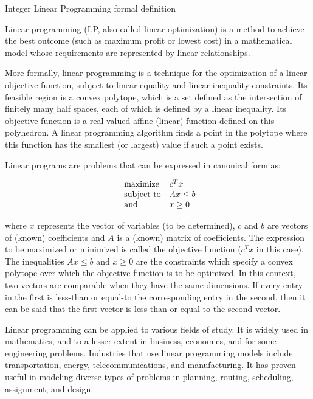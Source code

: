 \documentclass[9pt]{extarticle}
\begin{document}
    \begin{section}{Integer Linear Programming formal definition}

        Linear programming (LP, also called linear optimization) is a method to achieve the best outcome (such as maximum 
        profit or lowest cost) in a mathematical model whose requirements are represented by linear relationships.
        \cite{wiki:lp}

        More formally, linear programming is a technique for the optimization of a linear objective function, subject to 
        linear equality and linear inequality constraints. 
        Its feasible region is a convex polytope, which is a set defined as the intersection of finitely many half spaces, 
        each of which is defined by a linear inequality. 
        Its objective function is a real-valued affine (linear) function defined on this polyhedron. 
        A linear programming algorithm finds a point in the polytope where this function has the smallest (or largest) 
        value if such a point exists. \cite{wiki:lp}
        \newpage

        Linear programs are problems that can be expressed in canonical form as:
        
        \begin{equation*}
            \begin{array}{ll@{}ll}
                \text{maximize}  & c^{T}x \\
                \text{subject to} & Ax \leq b \\
                \text{and} & x \ge 0
            \end{array}
        \end{equation*}

        where $x$ represents the vector of variables (to be determined), $c$ and $b$ are vectors of (known) coefficients and 
        $A$ is a (known) matrix of coefficients.
        The expression to be maximized or minimized is called the objective function ($c^{T}x$ in this case). 
        The inequalities $Ax \leq b$ and $x \ge 0$ are the constraints which specify a convex polytope over which the objective 
        function is to be optimized. 
        In this context, two vectors are comparable when they have the same dimensions. 
        If every entry in the first is less-than or equal-to the corresponding entry in the second, then it can be said 
        that the first vector is less-than or equal-to the second vector.
        \cite{wiki:lp}

        Linear programming can be applied to various fields of study. 
        It is widely used in mathematics, and to a lesser extent in business, economics, and for some engineering problems. 
        Industries that use linear programming models include transportation, energy, telecommunications, and manufacturing. 
        It has proven useful in modeling diverse types of problems in planning, routing, scheduling, assignment, and design.
        \cite{wiki:lp}


\end{section}
\end{document}
